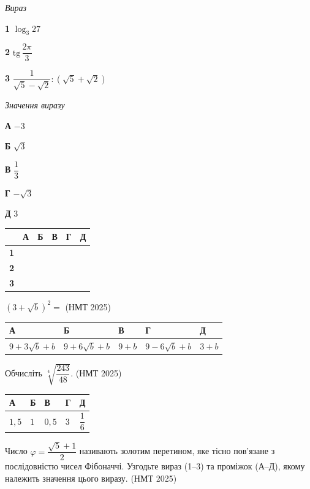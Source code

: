 \documentclass[14pt]{extarticle}
\newcommand{\answerTable}[5]{
\begin{center}
\begin{tabular}{|*{5}{>{\centering\arraybackslash}m{2.8cm}|}}
\hline
\rule[-0.3cm]{0pt}{0.8cm}\textbf{А} & \textbf{Б} & \textbf{В} & \textbf{Г} & \textbf{Д} \\
\hline
\rule[-0.4cm]{0pt}{1.0cm}#1 & \rule[-0.4cm]{0pt}{1.0cm}#2 & \rule[-0.4cm]{0pt}{1.0cm}#3 & \rule[-0.4cm]{0pt}{1.0cm}#4 & \rule[-0.4cm]{0pt}{1.0cm}#5 \\
\hline
\end{tabular}
\end{center}
}
\newcommand{\answerTableBig}[5]{
\begin{center}
\begin{tabular}{|*{5}{>{\centering\arraybackslash}m{2.8cm}|}}
\hline
\rule[-0.3cm]{0pt}{0.8cm}\textbf{А} & \textbf{Б} & \textbf{В} & \textbf{Г} & \textbf{Д} \\
\hline
\rule[-0.6cm]{0pt}{1.4cm}#1 & \rule[-0.6cm]{0pt}{1.4cm}#2 & \rule[-0.6cm]{0pt}{1.4cm}#3 & \rule[-0.6cm]{0pt}{1.4cm}#4 & \rule[-0.6cm]{0pt}{1.4cm}#5 \\
\hline
\end{tabular}
\end{center}
}
\newcommand{\matchTable}{
\begin{tabular}{|>{\centering\arraybackslash}p{0.3cm}|*{5}{>{\centering\arraybackslash}p{0.3cm}|}}
\hline
& \textbf{А} & \textbf{Б} & \textbf{В} & \textbf{Г} & \textbf{Д} \\
\hline
\textbf{1} & \rule{0pt}{0.3cm} & & & & \\
\hline
\textbf{2} & \rule{0pt}{0.3cm} & & & & \\
\hline
\textbf{3} & \rule{0pt}{0.3cm} & & & & \\
\hline
\end{tabular}
}
\newcommand{\task}[2]{\noindent\makebox[1.5em][l]{\textbf{#1.}}\parbox[t]{\dimexpr\textwidth-1.5em}{#2}}
\newcommand{\nmtyear}[1]{\hfill{\small\color{yearcolor}(НМТ #1)}}
\begin{document}
\vspace{0.3cm}
\begin{minipage}{0.4\textwidth}
\textit{Вираз}

\vspace{0.2cm}
\textbf{1} \quad $\log_3 27$

\vspace{0.3cm}
\textbf{2} \quad $\mathrm{tg}\,\dfrac{2\pi}{3}$

\vspace{0.4cm}
\textbf{3} \quad $\dfrac{1}{\sqrt{5} - \sqrt{2}} : (\sqrt{5} + \sqrt{2})$
\end{minipage}
\hfill
\begin{minipage}{0.3\textwidth}
\textit{Значення виразу}

\vspace{0.2cm}
\textbf{А} \quad $-3$

\vspace{0.2cm}
\textbf{Б} \quad $\sqrt{3}$

\vspace{0.3cm}
\textbf{В} \quad $\dfrac{1}{3}$

\vspace{0.2cm}
\textbf{Г} \quad $-\sqrt{3}$

\vspace{0.2cm}
\textbf{Д} \quad $3$
\end{minipage}
\hfill
\begin{minipage}{0.2\textwidth}
\matchTable
\end{minipage}

\vspace{0.7cm}

\task{45}{$(3 + \sqrt{b})^2 =$ \nmtyear{2025}}
\answerTable{$9 + 3\sqrt{b} + b$}{$9 + 6\sqrt{b} + b$}{$9 + b$}{$9 - 6\sqrt{b} + b$}{$3 + b$}

\vspace{0.5cm}

\task{46}{Обчисліть $\sqrt[4]{\dfrac{243}{48}}$. \nmtyear{2025}}
\answerTableBig{$1{,}5$}{$1$}{$0{,}5$}{$3$}{$\dfrac{1}{6}$}

\vspace{0.5cm}

\task{47}{Число $\varphi = \dfrac{\sqrt{5} + 1}{2}$ називають золотим перетином, яке тісно пов'язане з послідовністю чисел Фібоначчі. Узгодьте вираз (1--3) та проміжок (А--Д), якому належить значення цього виразу. \nmtyear{2025}}
\end{document}
